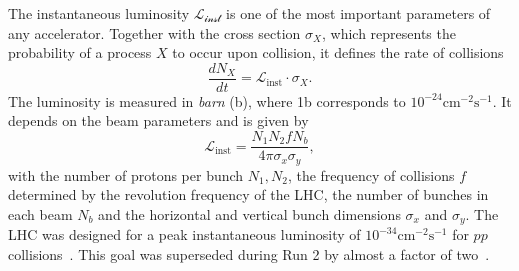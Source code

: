 The instantaneous luminosity $\mathcal{L_\text{inst}}$ is one of the most important parameters of any accelerator. Together with the cross section $\sigma_X$, which represents the probability of a process $X$ to occur upon collision, it defines the rate of collisions
\begin{equation}
    \frac{dN_X}{dt} = \mathcal{L}_\text{inst}\cdot \sigma_X.
\end{equation}
The luminosity is measured in \textit{barn} (b), where 1b corresponds to $10^{-24}\text{cm}^{-2}\text{s}^{-1}$.
It depends on the beam parameters and is given by
\begin{equation}
    \mathcal{L}_\text{inst} = \frac{N_1 N_2 f N_b}{4\pi \sigma_x \sigma_y},
\end{equation}
with the number of protons per bunch $N_1, N_2$, the frequency of collisions $f$ determined by the revolution frequency of the LHC, the number of bunches in each beam $N_b$ and the horizontal and vertical bunch dimensions $\sigma_x$ and $\sigma_y$. The LHC was designed for a peak instantaneous luminosity of $10^{-34}\text{cm}^{-2}\text{s}^{-1}$ for $pp$ collisions~\cite{CERN-2004-003-V-1}.
This goal was superseded during Run 2 by almost a factor of two~\cite{DAPR-2021-01}.

